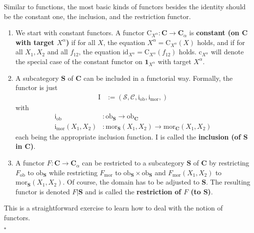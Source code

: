 \begin{exa}
\label{exa:basicsfuncs1}
Similar to functions, the most basic kinds of functors besides the identity should be the constant one, the inclusion, and the restriction functor.
\begin{enumerate}
\item[(a)]
We start with constant functors.
A functor $\mathrm{C}_{X^{\alpha}} \colon \mathbf{C} \rightarrow \mathbf{C}_{\alpha}$ is \textbf{constant (on $\mathbf{C}$ with target $X^{\alpha}$)} if for all $X$, the equation $X^{\alpha} = \mathrm{C}_{X^{\alpha}}(X)$ holds, and if for all $X_{1},X_{2}$ and all $f_{12}$, the equation $\mathrm{id}_{X^{\alpha}} = \mathrm{C}_{X^{\alpha}}(f_{12})$ holds.
$\mathrm{c}_{X^{\alpha}}$ will denote the special case of the constant functor on $\mathbf{1}_{X^{\alpha}}$ with target $X^{\alpha}$.
\item[(b)]
A subcategory $\mathbf{S}$ of $\mathbf{C}$ can be included in a functorial way.
Formally, the functor is just
\begin{align*}
  \mathrm{I}
  &:=
  \left(
    \mathcal{S},
    \mathcal{C},
    \mathrm{i}_{\mathrm{ob}},
    \mathrm{i}_{\mathrm{mor}},
  \right)
\end{align*}
with
\begin{align*}
  \mathrm{i}_{\mathrm{ob}}
  &\colon
  \mathrm{ob}_{\mathbf{S}}
  \rightarrow
  \mathrm{ob}_{\mathbf{C}}
  \\
  \mathrm{i}_{\mathrm{mor}}(X_{1},X_{2})
  &\colon
  \mathrm{mor}_{\mathbf{S}}(X_{1},X_{2})
  \rightarrow
  \mathrm{mor}_{\mathbf{C}}(X_{1},X_{2})
\end{align*}
each being the appropriate inclusion function.
$\mathrm{I}$ is called the \textbf{inclusion (of $\mathbf{S}$ in $\mathbf{C}$)}.
\item[(c)]
A functor $F \colon \mathbf{C} \rightarrow \mathbf{C}_{\alpha}$ can be restricted to a subcategory $\mathbf{S}$ of $\mathbf{C}$ by restricting $F_{\mathrm{ob}}$ to $\mathrm{ob}_{\mathbf{S}}$ while restricting $F_{\mathrm{mor}}$ to $\mathrm{ob}_{\mathbf{S}} \times \mathrm{ob}_{\mathbf{S}}$ and $F_{\mathrm{mor}}(X_{1},X_{2})$ to $\mathrm{mor}_{\mathbf{S}}(X_{1},X_{2})$.
Of course, the domain has to be adjusted to $\mathbf{S}$.
The resulting functor is denoted $F \vert \mathbf{S}$ and is called the \textbf{restriction of $F$ (to $\mathbf{S}$)}.
\end{enumerate}
\end{exa}
\begin{prf}
This is a straightforward exercise to learn how to deal with the notion of functors.
\\
\phantom{proven}
\hfill
$\square$
\end{prf}
